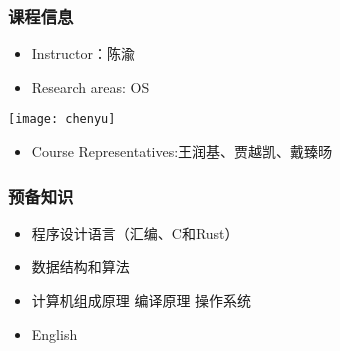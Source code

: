 %
%
\begin{frame}[t]
	\frametitle{课程信息}
	\begin{itemize}
		\item Instructor：陈渝	 
		\item Research areas: OS
	\end{itemize}	
	\texttt{[image: chenyu]}

 	\begin{itemize}
		\item Course Representatives:王润基、贾越凯、戴臻旸
	\end{itemize}


\end{frame}
\begin{frame}

\frametitle{预备知识}

\begin{itemize}

\item 程序设计语言（汇编、C和Rust）
\item 数据结构和算法
\item 计算机组成原理 编译原理 操作系统
\item English
\end{itemize}

\end{frame}
